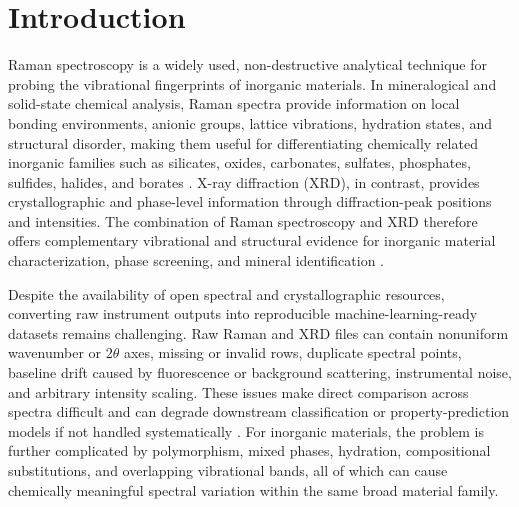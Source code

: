 \section{Introduction}
\label{sec:intro}

Raman spectroscopy is a widely used, non-destructive analytical technique for probing the vibrational fingerprints of inorganic materials. In mineralogical and solid-state chemical analysis, Raman spectra provide information on local bonding environments, anionic groups, lattice vibrations, hydration states, and structural disorder, making them useful for differentiating chemically related inorganic families such as silicates, oxides, carbonates, sulfates, phosphates, sulfides, halides, and borates \cite{farmer1974minerals,mcmillan1984ramanglasses,nakamoto2009infraredraman,lafuente2015rruff}. X-ray diffraction (XRD), in contrast, provides crystallographic and phase-level information through diffraction-peak positions and intensities. The combination of Raman spectroscopy and XRD therefore offers complementary vibrational and structural evidence for inorganic material characterization, phase screening, and mineral identification \cite{grazulis2009cod,grazulis2012cod,guo2024xrddeeplearning,rincon2025simpod,guo2024pxrdnet}.

Despite the availability of open spectral and crystallographic resources, converting raw instrument outputs into reproducible machine-learning-ready datasets remains challenging. Raw Raman and XRD files can contain nonuniform wavenumber or $2\theta$ axes, missing or invalid rows, duplicate spectral points, baseline drift caused by fluorescence or background scattering, instrumental noise, and arbitrary intensity scaling. These issues make direct comparison across spectra difficult and can degrade downstream classification or property-prediction models if not handled systematically \cite{savitzky1964smoothing,zhang2010airpls,baek2015arpls,rinnan2009preprocessing}. For inorganic materials, the problem is further complicated by polymorphism, mixed phases, hydration, compositional substitutions, and overlapping vibrational bands, all of which can cause chemically meaningful spectral variation within the same broad material family.

